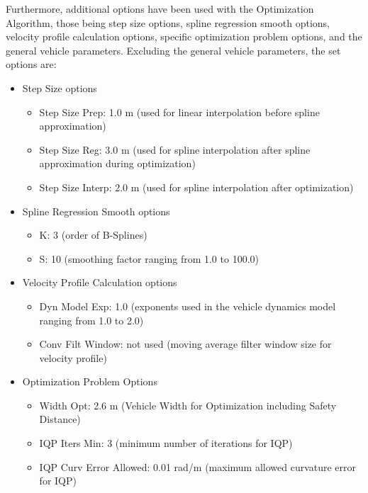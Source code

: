 Furthermore, additional options have been used with the Optimization Algorithm, those being step size options, spline regression smooth options, velocity profile calculation options, specific optimization problem options, and the general vehicle parameters. Excluding the general vehicle parameters, the set options are:
\begin{itemize}
    \item Step Size options
          \begin{itemize}
              \item Step Size Prep: 1.0 m (used for linear interpolation before spline approximation)
              \item Step Size Reg: 3.0 m (used for spline interpolation after spline approximation during optimization)
              \item Step Size Interp: 2.0 m (used for spline interpolation after optimization)
          \end{itemize}
    \item Spline Regression Smooth options
          \begin{itemize}
              \item K: 3 (order of B-Splines)
              \item S: 10 (smoothing factor ranging from 1.0 to 100.0)
          \end{itemize}
    \item Velocity Profile Calculation options
          \begin{itemize}
              \item Dyn Model Exp: 1.0 (exponents used in the vehicle dynamics model ranging from 1.0 to 2.0)
              \item Conv Filt Window: not used (moving average filter window size for velocity profile)
          \end{itemize}
    \item Optimization Problem Options
          \begin{itemize}
              \item Width Opt: 2.6 m (Vehicle Width for Optimization including Safety Distance)
              \item IQP Iters Min: 3 (minimum number of iterations for IQP)
              \item IQP Curv Error Allowed: 0.01 rad/m (maximum allowed curvature error for IQP)
          \end{itemize}
\end{itemize}

